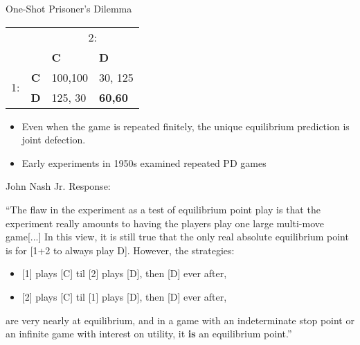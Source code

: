 \documentclass[english]{beamer}
\begin{document}
\begin{frame}{One-Shot Prisoner's Dilemma}
\begin{card}
    \begin{center}
    \begin{tabular}{cc|p{}|p{}|}
     & \multicolumn{1}{c}{} & \multicolumn{2}{c}{2:}\\
     & \multicolumn{1}{c}{} & \multicolumn{1}{p{0.14\textwidth}}{\textbf{C}} & \multicolumn{1}{p{0.14\textwidth}}{\textbf{D}}\\
    \cline{3-4}
    \multirow{2}{*}{1:} & \textbf{C} & 100,100 & 30, 125\\
    \cline{3-4}
     & \textbf{D} & 125, 30 & \textbf{60,60}\\
    \cline{3-4}
    \end{tabular}
    \end{center}
\end{card}

\begin{card}
    \begin{itemize}
    \item Even when the game is repeated finitely, the unique equilibrium prediction is joint defection.
    \item Early experiments in 1950s examined repeated PD games
    \end{itemize}
\end{card}
\end{frame}

\begin{frame}{John Nash Jr. Response:}
\begin{card}
``The flaw in the experiment as a test of equilibrium point play is
that the experiment really amounts to having the players play one
large multi-move game[...] In this view, it is still true that the only
real absolute equilibrium point is for {[}1+2 to always play D{]}.
However, the strategies:
\begin{itemize}
\item {[}1{]} plays {[}C{]} til {[}2{]} plays {[}D{]}, then {[}D{]} ever
after,
\item {[}2{]} plays {[}C{]} til {[}1{]} plays {[}D{]}, then {[}D{]} ever
after,\end{itemize}
are very nearly at equilibrium, and in a game with an indeterminate
	stop point or an infinite game with interest on utility, it \textbf{is}	an equilibrium point.''
	\end{card}
\end{frame}
\end{document}
